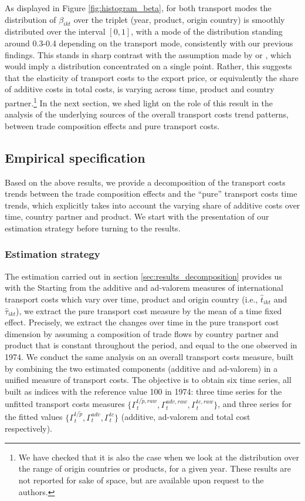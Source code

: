 \documentclass[a4paper,11pt]{article}
\begin{document}
As displayed in Figure \ref{fig:histogram_beta}, for both transport modes the distribution of $\beta_{ikt}$ over the triplet (year, product, origin country) is smoothly distributed over the interval $[0,1]$, with a mode of the distribution standing around 0.3-0.4 depending on the transport mode, consistently with our previous findings.
This stands in sharp contrast with the assumption made by  \cite{hummels_skiba} or \cite{hummels2007}, which would imply a distribution concentrated on a single point.
Rather, this suggests that the elasticity of transport costs to the export price, or equivalently the share of additive costs in total costs, is varying across time, product and country partner.\footnote{We have checked that it is also the case when we look at the distribution over the range of origin countries or products, for a given year.
These results are not reported for sake of space, but are available upon request to the authors.} In the next section, we shed light on the role of this result in the analysis of the underlying sources of the overall transport costs trend patterns, between trade composition effects and pure transport costs.

\subsection{Empirical specification}

Based on the above results, we provide a decomposition of the transport costs trends between the trade composition effects and the ``pure'' transport costs time trends, which explicitly takes into account the varying share of additive costs over time, country partner and product. We start with the presentation of our estimation strategy before turning to the results.

\subsubsection{Estimation strategy}

The estimation carried out in section \ref{sec:results_decomposition} provides us with the
Starting from the additive and ad-valorem measures of international transport costs which vary over time, product and origin country (i.e., $\widehat{t}_{ikt}$ and $\widehat{\tau}_{ikt}$), we extract the pure transport cost measure by the mean of a time fixed effect.
Precisely, we extract the changes over time in the pure transport cost dimension by assuming a composition of trade flows by country partner and product that is constant throughout the period, and equal to the one observed in 1974. We conduct the same analysis on an overall transport costs measure, built by combining the two estimated components (additive and ad-valorem) in a unified measure of transport costs. The objective is to obtain six time series, all built as indices with the reference value 100 in 1974: three time series for the unfitted transport costs measures $\{\Gamma^{t/\widetilde{p}, raw}_t, \Gamma^{adv, raw}_t, \Gamma^{tc, raw}_t \}$, and three series for the fitted values $\{\Gamma^{t/\widetilde{p}}_t, \Gamma^{adv}_t, \Gamma^{tc}_t \}$ (additive, ad-valorem and total cost respectively).
\end{document}
